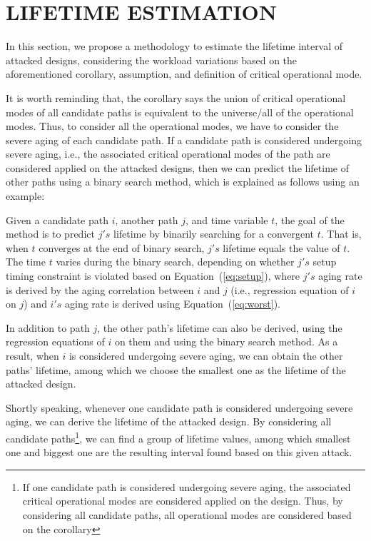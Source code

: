 
\section{LIFETIME ESTIMATION}
\label{sec:lt_estimation}
In this section, we propose a methodology to estimate the lifetime interval of attacked designs, considering the workload variations based on the aforementioned corollary, assumption, and definition of critical operational mode.

It is worth reminding that, the corollary says the union of critical operational modes of all candidate paths is equivalent to the universe/all of the operational modes. Thus, to consider all the operational modes, we have to consider the severe aging of each candidate path. If a candidate path is considered undergoing severe aging, i.e., the associated critical operational modes of the path are considered applied on the attacked designs, then we can predict the lifetime of other paths using a binary search method, which is explained as follows using an example:

Given a candidate path $i$, another path $j$, and time variable $t$, the goal of the method is to predict $j's$ lifetime by binarily searching for a convergent $t$. That is, when $t$ converges at the end of binary search, $j's$ lifetime equals the value of $t$. The time $t$ varies during the binary search, depending on whether $j's$ setup timing constraint is violated based on Equation~(\ref{eq:setup}), where $j's$ aging rate is derived by the aging correlation between $i$ and $j$ (i.e., regression equation of $i$ on $j$) and $i's$ aging rate is derived using Equation~(\ref{eq:worst}). 

In addition to path $j$, the other path's lifetime can also be derived, using the regression equations of $i$ on them and using the binary search method. As a result, when $i$ is considered undergoing severe aging, we can obtain the other paths' lifetime, among which we choose the smallest one as the lifetime of the attacked design.

Shortly speaking, whenever one candidate path is considered undergoing severe aging, we can derive the lifetime of the attacked design. By considering all candidate paths\footnote{If one candidate path is considered undergoing severe aging, the associated critical operational modes are considered applied on the design. Thus, by considering all candidate paths, all operational modes are considered based on the corollary}, we can find a group of lifetime values, among which smallest one and biggest one are the resulting interval found based on this given attack.


  
